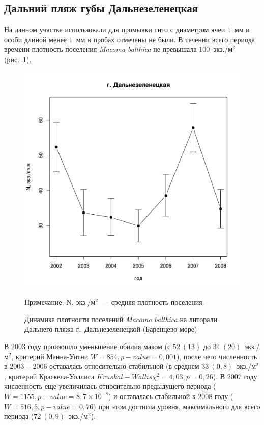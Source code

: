 		\subsection{Дальний пляж губы Дальнезеленецкая}
На данном участке использовали для промывки сито с диаметром ячеи $1$~мм и особи длиной менее $1$~мм в пробах отмечены не были. 
В течении всего периода времени плотность поселения {\it Macoma balthica} не превышала $100$~экз./м$^2$  (рис.~\ref{ris:dynamic_Zelency}). 
	\begin{figure}[p]
		\includegraphics{../Barenc_Sea/Dalnezeleneckaya/N_dynamic1.pdf}
	\caption{Динамика плотности поселений {\it Macoma balthica} на литорали Дальнего пляжа г.~Дальнезеленецкой (Баренцево море)}
{\footnotesize Примечание: N, экз./м$^2$~--- средняя плотность поселения.}
	\label{ris:dynamic_Zelency}
	\end{figure}

В $2003$ году произошло уменьшение обилия маком (с $52~(13)$ до $34~(20)$~экз./м$^2$, критерий Манна-Уитни  $W = 854, p-value = 0,001$), после чего численность  в $2003 - 2006$ оставалась относительно стабильной (в среднем $33~(0,8)$~экз./м$^2$, критерий Краскела-Уоллиса $Kruskal-Wallis \chi^2 = 4,03, p = 0,26$). 
В $2007$ году численность еще увеличилась относительно предыдущего периода ($W = 1155, p-value = 8,7 \times 10^{-8}$) и оставалась стабильной к $2008$ году ($W = 516,5, p-value = 0,76$) при этом достигла уровня, максимального для всего периода ($72~(0,9)$~экз./м$^2$).


\afterpage{\clearpage}




